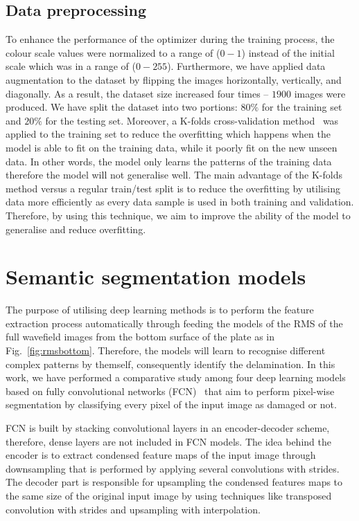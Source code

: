 \documentclass[runningheads]{llncs}
\begin{document}
\subsection{Data preprocessing}
To enhance the performance of the optimizer during the training process, the colour scale values were normalized to a range of (\(0-1\)) instead of the initial scale which was in a range of (\(0 - 255\)).	
Furthermore, we have applied data augmentation to the dataset by flipping the images horizontally, vertically, and diagonally. 
As a result, the dataset size increased four times -- \(1900\)  images were produced.
We have split the dataset into two portions:  \(80\%\) for the training set and \(20\%\) for the testing set.
Moreover, a K-folds cross-validation method~\cite{Srinivasan2019} was applied to the training set to reduce the overfitting which happens when the model is able to fit on the training data, while it poorly fit on the new unseen data.
In other words, the model only learns the patterns of the training data therefore the model will not generalise well. 
The main advantage of the K-folds method versus a regular train/test split is to reduce the overfitting by utilising data more efficiently as every data sample is used in both training and validation. 
Therefore, by using this technique, we aim to improve the ability of the model to generalise and reduce overfitting.
\section{Semantic segmentation models}
\label{section:semantic_segmentation}
The purpose of utilising deep learning methods is to perform the feature extraction process automatically through feeding the models  of the RMS of the full wavefield images from the bottom surface of the plate as in Fig.~\ref{fig:rmsbottom}.
Therefore, the models will learn to recognise different complex patterns by themself, consequently identify the delamination. 
In this work, we have performed a comparative study among four deep learning models based on fully convolutional networks (FCN)~\cite{shelhamer2017fully} that aim to perform pixel-wise segmentation by classifying every pixel of the input image as damaged or not. 

FCN is built by stacking convolutional layers in an encoder-decoder scheme, therefore, dense layers are not included in FCN models. 
The idea behind the encoder is to extract condensed feature maps of the input image through downsampling that is performed by applying several convolutions with strides.
The decoder part is responsible for upsampling the condensed features maps to the same size of the original input image by using techniques like transposed convolution with strides and upsampling with interpolation.
\end{document}
